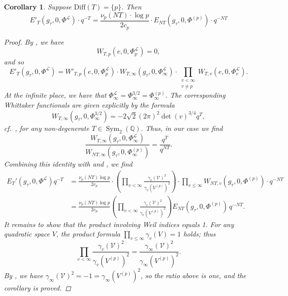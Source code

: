 \documentclass[reqno,oneside]{amsart}
\theoremstyle{plain}
\newtheorem{corollary}[theorem]{Corollary}
\theoremstyle{remark}
\numberwithin{theorem}{section}
\newcommand{\bbQ}{\mathbb Q}
\newcommand{\calL}{\mathcal L}
\newcommand{\calV}{\mathcal V}
\DeclareMathOperator{\Sym}{Sym}
\begin{document}
	\begin{corollary} \label{cor:nondeg Eis shift}
		Suppose $\mathrm{Diff}(T) = \{p\}$. Then
		\begin{equation*}
		E'_T(g_{\tau}, 0, \Phi^{\calL}) \cdot q^{-T} = \frac{\nu_p(NT) \cdot \log p}{2 c_p}   \cdot E_{NT}(g_{\tau}, 0, \Phi^{(p)}) \cdot q^{-NT}
		\end{equation*}
		
		\begin{proof}
			By , we have
			\begin{equation}
			W_{T,p}(e, 0, \Phi^{\calL}_p) = 0,
			\end{equation}
			and so
			\begin{equation}
			E'_T(g_{\tau}, 0, \Phi^{\calL}) = W'_{T,p}(e, 0, \Phi_{p}^{\calL}) \cdot  W_{T,\infty}(g_{\tau}, 0, \Phi^{\calL}_{\infty}) \cdot \prod_{ \substack { v < \infty \\ v \neq p}} W_{T,v}(e, 0, \Phi_{v}^{\calL}).
			\end{equation}
			At the infinite place, we have that $\Phi_{\infty}^{\calL} = \Phi_{\infty}^{3/2} = \Phi_{\infty}^{(p)}$. The corresponding Whittaker functionals are given explicitly by the formula
			\begin{equation}
			W_{T,\infty}(g_{\tau}, 0, \Phi_{\infty}^{3/2} )  = - 2 \sqrt{2}(2 \pi)^2 \det(v)^{3/4} q^T,
			\end{equation}
			cf.\  \cite[Theorem 5.2.7(i)]{KRYbook}, for any non-degenerate $T \in \Sym_2(\bbQ)$. Thus, in our case we find
			\begin{equation} \label{eq:infty}
			\frac{W_{T, \infty}(g_{\tau}, 0, \Phi_{\infty}^{\calL})}{W_{NT, \infty}(g_{\tau}, 0, \Phi_{\infty}^{(p)})} = \frac{q^T}{q^{NT}}.
			\end{equation}
			Combining this identity with  and , we find
			\begin{align}
			E_T'(g_{\tau}, 0, \Phi^{\calL}) q^{-T} &= \frac{\nu_p(NT) \log p}{2 c_p} \cdot \left( \prod_{v < \infty} \frac{\gamma_v(\calV)^2}{\gamma_v(V^{(p)})^2} \right)  \cdot \prod_{v \leq \infty} W_{NT,v}(g_{\tau}, 0, \Phi^{(p)}) \cdot q^{-NT} \\
			&= \frac{\nu_p(NT) \log p}{2 c_p}  \left( \prod_{v < \infty} \frac{\gamma_v(\calV)^2}{\gamma_v(V^{(p)})^2} \right)   E_{NT}(g_{\tau}, 0, \Phi^{(p)}) \,  q^{-NT}.
			\end{align}
			It remains to show that the product involving Weil indices equals 1. For any quadratic space $V$, the product formula $\prod_{v \leq \infty} \gamma_v(V) = 1$ holds; thus
			\begin{equation}
			\prod_{v < \infty} \frac{\gamma_v(\calV)^2}{\gamma_v(V^{(p)})^2}  = \frac{\gamma_{\infty}(\calV)^2}{\gamma_{\infty}(V^{(p)})^2}.
			\end{equation}
			By \cite[p.\ 330]{KRYbook}, we have $\gamma_{\infty}(\calV)^2 = -1 = \gamma_{\infty}(V^{(p)})^2$, so the ratio above is one, and the corollary is proved.
		\end{proof}
	\end{corollary}
	
\end{document}
